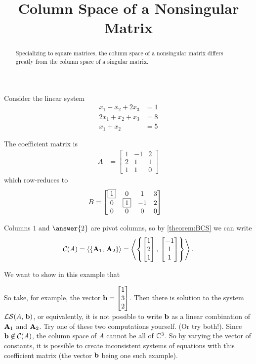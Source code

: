 \documentclass{ximera}
\title{Column Space of a Nonsingular Matrix}
\begin{document}
\begin{abstract}
  Specializing to square matrices, the column space of a nonsingular
  matrix differs greatly from the column space of a singular matrix.
\end{abstract}
\maketitle

\begin{example}
  Consider the linear system
  \begin{align*}
    x_1 -x_2 +2x_3 & =1\\
    2x_1+ x_2 + x_3 & =8\\
    x_1 + x_2 & =5
  \end{align*}

  The coefficient matrix is
  \begin{align*}
    A &= \begin{bmatrix}
      1 & -1 & 2\\
      2 & 1 & 1\\
      1 & 1 & 0
    \end{bmatrix}
  \end{align*}
  which row-reduces to
  \begin{align*}
    B&=\begin{bmatrix}
      \fbox{1} & 0 & 1 & 3\\
      0 & \fbox{1} & -1 & 2\\
      0 & 0 & 0 & 0
    \end{bmatrix}
  \end{align*}

  Columns $1$ and $\answer{2}$ are pivot columns, so by
  \ref{theorem:BCS} we can write
  \[
    \mathcal{C}\!\left(A\right)=\left\langle\left\{\mathbf{A}_1,\,\mathbf{A}_2\right\}\right\rangle=\left\langle\left\{\begin{bmatrix}1\\2\\1\end{bmatrix},\,\begin{bmatrix}-1\\1\\1\end{bmatrix}\right\}\right\rangle.
  \]

  We want to show in this example that
  \begin{multipleChoice}
  \end{multipleChoice}

  So take, for example, the vector $\mathbf{b}=\begin{bmatrix}1\\3\\2\end{bmatrix}$.
  Then there is  solution
  to the system $\mathcal{LS}\!\left(A,\,\mathbf{b}\right)$, or equivalently, it is
  not possible to write $\mathbf{b}$ as a linear combination of
  $\mathbf{A}_1$ and $\mathbf{A}_2$.  Try one of these two computations
  yourself.  (Or try both!).  Since $\mathbf{b}\not\in\mathcal{C}\!\left(A\right)$, the
  column space of $A$ cannot be all of $\mathbb{C}^{3}$.  So by varying
  the vector of constants, it is possible to create inconsistent
  systems of equations with this coefficient matrix (the vector
  $\mathbf{b}$ being one such example).


\end{example}
\end{document}
